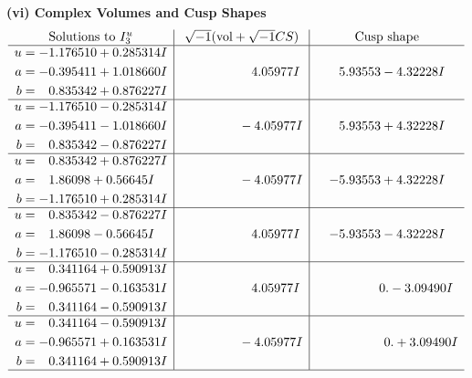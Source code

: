 \documentclass[1p]{elsarticle_modified}
\theoremstyle{definition}
\newcommand{\I}{\sqrt{-1}}
\begin{document}
\newpage\flushleft \textbf{(vi) Complex Volumes and Cusp Shapes}
$$\begin{array}{c|c|c}  
\text{Solutions to }I^u_{3}& \I (\text{vol} + \sqrt{-1}CS) & \text{Cusp shape}\\
 \hline 
\begin{aligned}
u &= -1.176510 + 0.285314 I \\
a &= -0.395411 + 1.018660 I \\
b &= \phantom{-}0.835342 + 0.876227 I\end{aligned}
 & \phantom{-0.000000 -}4.05977 I & \phantom{-}5.93553 - 4.32228 I \\ \hline\begin{aligned}
u &= -1.176510 - 0.285314 I \\
a &= -0.395411 - 1.018660 I \\
b &= \phantom{-}0.835342 - 0.876227 I\end{aligned}
 & \phantom{-0.000000 } -4.05977 I & \phantom{-}5.93553 + 4.32228 I \\ \hline\begin{aligned}
u &= \phantom{-}0.835342 + 0.876227 I \\
a &= \phantom{-}1.86098 + 0.56645 I \\
b &= -1.176510 + 0.285314 I\end{aligned}
 & \phantom{-0.000000 } -4.05977 I & -5.93553 + 4.32228 I \\ \hline\begin{aligned}
u &= \phantom{-}0.835342 - 0.876227 I \\
a &= \phantom{-}1.86098 - 0.56645 I \\
b &= -1.176510 - 0.285314 I\end{aligned}
 & \phantom{-0.000000 -}4.05977 I & -5.93553 - 4.32228 I \\ \hline\begin{aligned}
u &= \phantom{-}0.341164 + 0.590913 I \\
a &= -0.965571 - 0.163531 I \\
b &= \phantom{-}0.341164 - 0.590913 I\end{aligned}
 & \phantom{-0.000000 -}4.05977 I & \phantom{-0.000000 } 0. - 3.09490 I \\ \hline\begin{aligned}
u &= \phantom{-}0.341164 - 0.590913 I \\
a &= -0.965571 + 0.163531 I \\
b &= \phantom{-}0.341164 + 0.590913 I\end{aligned}
 & \phantom{-0.000000 } -4.05977 I & \phantom{-0.000000 -}0. + 3.09490 I\\
 \hline 
 \end{array}$$\newpage
\end{document}
